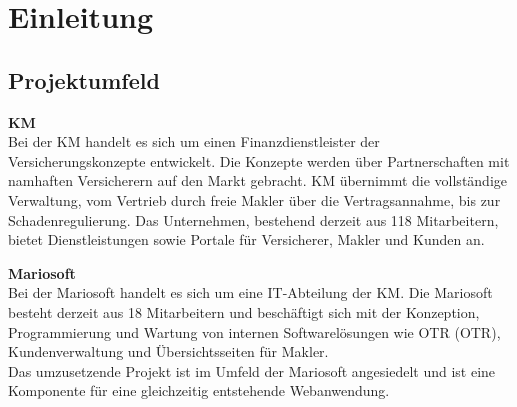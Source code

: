 
\section{Einleitung}
\label{einleitung}

\subsection{Projektumfeld}
\label{projektumfeld}
\textbf{\acl{KM}}
\\
Bei der \ac{KM} handelt es sich um einen Finanzdienstleister der Versicherungskonzepte entwickelt. Die Konzepte werden über Partnerschaften mit namhaften Versicherern auf den Markt gebracht. \ac{KM} übernimmt die vollständige Verwaltung, vom Vertrieb durch freie Makler über die Vertragsannahme, bis zur Schadenregulierung.
Das Unternehmen, bestehend derzeit aus 118 Mitarbeitern, bietet Dienstleistungen sowie Portale für Versicherer, Makler und Kunden an.

\textbf{Mariosoft}
\\
Bei der Mariosoft handelt es sich um eine IT-Abteilung der \ac{KM}. Die Mariosoft besteht derzeit aus 18 Mitarbeitern und beschäftigt sich mit der Konzeption, Programmierung und Wartung von internen Softwarelösungen wie \acl{OTR} (\ac{OTR}), Kundenverwaltung und Übersichtsseiten für Makler.
\\
Das umzusetzende Projekt ist im Umfeld der Mariosoft angesiedelt und ist eine Komponente für eine gleichzeitig entstehende Webanwendung.

